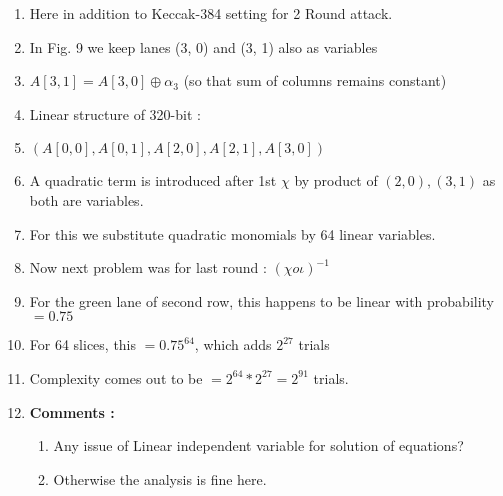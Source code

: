 \documentclass{article}
\begin{document}
    \begin{enumerate}
        \item Here in addition to Keccak-384 setting for 2 Round attack.
        \item In Fig. 9 we keep lanes (3, 0) and (3, 1) also as variables
        \item $A[3, 1] = A[3, 0] \oplus \alpha_3$ (so that sum of columns remains constant)
        \item Linear structure of 320-bit :
        \item $( A[0, 0], A[0, 1], A[2, 0], A[2, 1], A[3, 0] )$
        \item A quadratic term is introduced after 1st $\chi$ by product of $(2, 0), (3, 1)$ as both are variables.
        \item For this we substitute quadratic monomials by 64 linear variables.
        \item Now next problem was for last round : $(\chi o \iota)^{-1}$
        \item For the green lane of second row, this happens to be linear with probability $= 0.75$
        \item For 64 slices, this $= 0.75^{64}$, which adds $2^{27}$ trials
        \item Complexity comes out to be $ = 2^{64} * 2^{27} = 2^{91}$ trials.
        \item \textbf{ Comments : }
        \begin{enumerate}
            \item Any issue of Linear independent variable for solution of equations?
            \item Otherwise the analysis is fine here.
        \end{enumerate}
    \end{enumerate}
\end{document}
